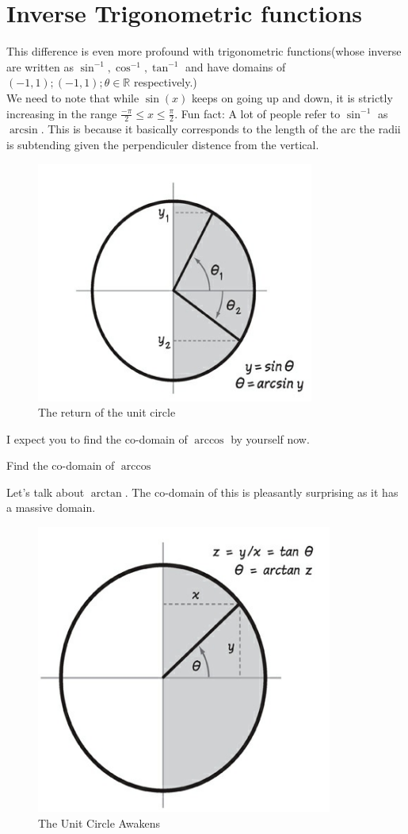 \section{Inverse Trigonometric functions}
This difference is even more profound with trigonometric functions(whose inverse are written as $\sin^{-1},\cos^{-1},\tan^{-1}$ and have domains of $(-1,1); (-1,1); \theta \in \mathbb{R}$ respectively.)\\
We need to note that while $\sin(x)$ keeps on going up and down, it is strictly increasing in the range $\frac{-\pi}{2}\leq x \leq \frac{\pi}{2}$. Fun fact: A lot of people refer to $\sin^{-1}$ as $\arcsin$. This is because it basically corresponds to the length of the arc the radii is subtending given the perpendiculer distence from the vertical.\\
\begin{figure} [h]
    \centering
    \includegraphics[width=0.5\linewidth]{Photos/Arcsin unit circle.png}
    \caption{The return of the unit circle}
\end{figure}
I expect you to find the co-domain of $\arccos$ by yourself now.
\begin{example}
    Find the co-domain of $\arccos$
\end{example}
Let's talk about $\arctan$. The co-domain of this is pleasantly surprising as it has a massive domain.\\
\begin{figure} [h]
    \centering
    \includegraphics[width=0.5\linewidth]{Photos/Arc tan Unit Circle.png}
    \caption{The Unit Circle Awakens}
    
\end{figure}
